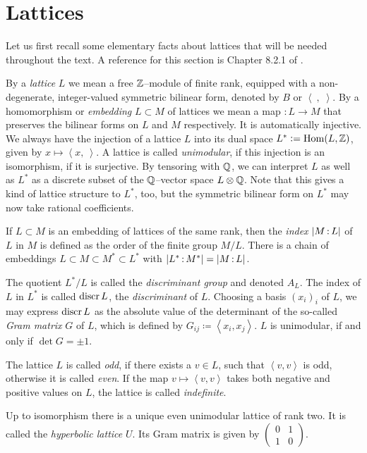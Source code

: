 
\chapter{Lattices}\label{latticeSubsection}
Let us first recall some elementary facts about lattices that will be needed throughout the text.
A reference for this section is Chapter 8.2.1 of \cite{Dolgachev}. 
\begin{definition}
By a \emph{lattice} $L$ we mean a free $\mathbb{Z}$--module of finite rank, equipped with a non-degenerate, integer-valued symmetric bilinear form, denoted by $B$ or $\left<\ ,\;\right>$. 
By a homomorphism or \emph{embedding} $L\subset M$ of lattices we mean a map $:L\rightarrow M$ that preserves the bilinear forms on $L$ and $M$ respectively. It is automatically injective. We always have the injection of a lattice $L$ into its dual space $L^*\vcentcolon= \operatorname{Hom}(L,\mathbb{Z})$, given by $x \mapsto \left<x,\ \right>$. A lattice is called \emph{unimodular}, if this injection is an isomorphism, \ie if it is surjective. By tensoring with $\mathbb{Q}$, we can interpret $L$ as well as $L^*$ as a discrete subset of the $\mathbb{Q}$--vector space $L\otimes \mathbb{Q}$. Note that this gives a kind of lattice structure to $L^*$, too, but the symmetric bilinear form on $L^*$ may now take rational coefficients.


If $L\subset M$ is an embedding of lattices of the same rank, then the \emph{index} $|M\,{:}\, L|$ of $L$ in $M$ is defined as the order of the finite group $M/L$.
There is a chain of embeddings $L\subset M \subset M^* \subset L^*$ with $|L^*\,{:}\, M^*| =|M\,{:}\, L| $.

The quotient $L^*/L$ is called the \emph{discriminant group} and denoted $A_L$. The index of $L$ in $L^*$ is called $\operatorname{discr} L$, the \emph{discriminant} of $L$.
Choosing a basis $(x_i)_i$ of $L$, we may express $\operatorname{discr} L$ as the absolute value of the determinant of the so-called \emph{Gram matrix} $G$ of $L$, which is defined by $G_{ij}\coloneqq \left<x_i,x_j\right>$. $L$ is unimodular, if and only if $\det G =\pm 1$.

The lattice $L$ is called \emph{odd}, if there exists a $v\in L$, such that $\left<v,v\right>$ is odd, otherwise it is called \emph{even}. 
If the map $v \mapsto \left<v,v\right>$ takes both negative and positive values on $L$, the lattice is called \emph{indefinite}. 
\end{definition}
\begin{example}
Up to isomorphism there is a unique even unimodular lattice of rank two. It is called the \emph{hyperbolic lattice} $U$. Its Gram matrix is given by 
$\left(\begin{smallmatrix} 0&1\\ 1&0 \end{smallmatrix}\right)$.
\end{example}
